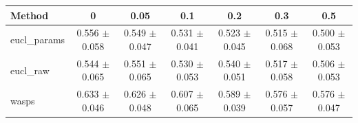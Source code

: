 \begin{table}[htbp]
\centering
\begin{NiceTabular}{lcccccc}
\toprule
Method & 0 & 0.05 & 0.1 & 0.2 & 0.3 & 0.5 \\
\midrule
eucl\_params & 0.556 $\pm$ 0.058 & 0.549 $\pm$ 0.047 & 0.531 $\pm$ 0.041 & 0.523 $\pm$ 0.045 & 0.515 $\pm$ 0.068 & 0.500 $\pm$ 0.053 \\
eucl\_raw & 0.544 $\pm$ 0.065 & 0.551 $\pm$ 0.065 & 0.530 $\pm$ 0.053 & 0.540 $\pm$ 0.051 & 0.517 $\pm$ 0.058 & 0.506 $\pm$ 0.053 \\
wasps & 0.633 $\pm$ 0.046 & 0.626 $\pm$ 0.048 & 0.607 $\pm$ 0.065 & 0.589 $\pm$ 0.039 & 0.576 $\pm$ 0.057 & 0.576 $\pm$ 0.047 \\
\bottomrule
\end{NiceTabular}
\label{tab:sens_river_decimation_knn}
\end{table}
